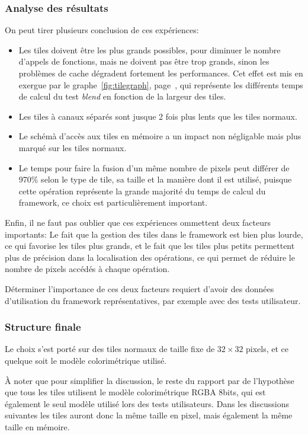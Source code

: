 		\subsubsection{Analyse des résultats}
			On peut tirer plusieurs conclusion de ces expériences:
			\begin{itemize}
				\item Les tiles doivent être les plus grands possibles, pour diminuer le 
			nombre d'appels de fonctions, mais ne doivent pas être trop grands, sinon les problèmes de cache dégradent fortement les performances.
				Cet effet est mis en exergue par le graphe~\ref{fig:tilegraph}, page~\pageref{fig:tilegraph}, qui représente les différents
				temps de calcul du test \emph{blend} en fonction de la largeur des tiles.  
				\item Les tiles à canaux séparés sont jusque 2 fois plus lents que les tiles normaux.
				\item Le schémà d'accès aux tiles en mémoire a un impact non négligable mais plus marqué sur les tiles normaux.
				\item Le temps pour faire la fusion d'un même nombre de pixels peut différer de 970\% selon le type de tile, sa taille et la
				manière dont il est utilisé, puisque cette opération représente la grande majorité du temps de calcul du framework, ce choix
				est particulièrement important.
			\end{itemize}
			Enfin, il ne faut pas oublier que ces expériences ommettent deux facteurs importants: Le fait que la gestion des tiles dans le framework 
			est bien plus lourde, ce qui favorise les tiles plus grands, et le fait que les tiles plus petits permettent plus de précision dans 
			la localisation des opérations, ce qui permet de réduire le nombre de pixels accédés à chaque opération.

			Déterminer l'importance de ces deux facteurs requiert d'avoir des données d'utilisation du framework représentatives, par exemple
			avec des tests utilisateur. 
		\subsubsection{Structure finale}
			Le choix s'est porté sur des tiles normaux de taille fixe de $32\times32$ pixels, et ce quelque soit le modèle colorimétrique utilisé.

			À noter que pour simplifier la discussion, le reste du rapport par de l'hypothèse que tous les tiles utilisent le modèle colorimétrique
			RGBA 8bits, qui est également le seul modèle utilisé lors des tests utilisateurs. Dans les discussions suivantes les tiles
			auront donc la même taille en pixel, mais également la même taille en mémoire. 

